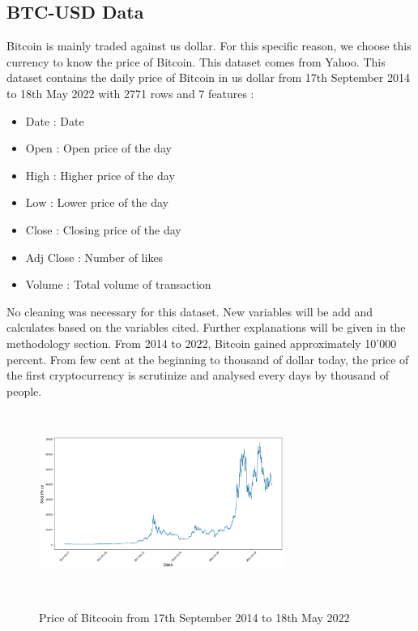 \documentclass[conference]{IEEEtran}
\begin{document}
\subsection{BTC-USD Data}\label{AA}
Bitcoin is mainly traded against us dollar. For this specific reason, we choose this currency to know the price of Bitcoin. This dataset comes from Yahoo.\cite{b6} This dataset contains the daily price of Bitcoin in us dollar from 17th September 2014 to 18th May 2022 with 2771 rows and 7 features : \newline
\begin{itemize}
        \item Date : Date
        \item Open : Open price of the day
        \item High : Higher price of the day
        \item Low : Lower price of the day
        \item Close : Closing price of the day
        \item Adj Close : Number of likes
        \item Volume : Total volume of transaction   
\end{itemize}
\medskip
No cleaning was necessary for this dataset.
New variables will be add and calculates based on the variables cited. Further explanations will be given in the methodology section.
\newline
From 2014 to 2022, Bitcoin gained approximately 10'000 percent. From few cent at the beginning to thousand of dollar today, the price of the first cryptocurrency is scrutinize and analysed every days by thousand of people. 

\begin{figure}[H]
	\includegraphics[width=8cm,
 height=6cm]{BTC}
	\label{fig}
	\caption{Price of Bitcooin from 17th September 2014 to 18th May 2022}
\end{figure}
\end{document}
